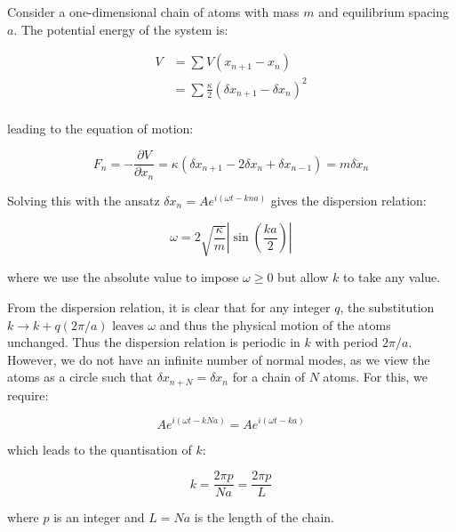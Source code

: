 \documentclass[12pt]{article}
\begin{document}
Consider a one-dimensional chain of atoms with mass $m$ and equilibrium spacing $a$. The potential energy of the system is:

\begin{equation}
    \begin{split}
        V &= \sum V(x_{n + 1} - x_{n}) \\
        &= \sum \frac{\kappa}{2} (\delta x_{n + 1} - \delta x_{n})^2 \\
    \end{split}
\end{equation}

leading to the equation of motion:

\begin{equation}
    F_{n} = -\frac{\partial V}{\partial x_{n}} = \kappa (\delta x_{n + 1} - 2\delta x_{n} + \delta x_{n - 1}) = m \delta \ddot{x}_{n}
\end{equation}

Solving this with the ansatz $\delta x_{n} = A e^{i(\omega t - kna)}$ gives the dispersion relation:

\begin{equation}
    \omega = 2\sqrt{\frac{\kappa}{m}} \left\lvert \sin{\left( \frac{ka}{2} \right)} \right\rvert
\end{equation}

where we use the absolute value to impose $\omega \geq 0$ but allow $k$ to take any value.

From the dispersion relation, it is clear that for any integer $q$, the substitution $k \to k + q (2\pi/a)$ leaves $\omega$ and thus the physical motion of the atoms unchanged. Thus the dispersion relation is periodic in $k$ with period $2\pi/a$. However, we do not have an infinite number of normal modes, as we view the atoms as a circle such that $\delta x_{n + N} = \delta x_{n}$ for a chain of $N$ atoms. For this, we require:

\begin{equation}
    A e^{i(\omega t - kNa)} = A e^{i(\omega t - ka)}
\end{equation}

which leads to the quantisation of $k$:

\begin{equation}
    k = \frac{2\pi p}{Na} = \frac{2\pi p}{L}
\end{equation}

where $p$ is an integer and $L = Na$ is the length of the chain.
\end{document}
